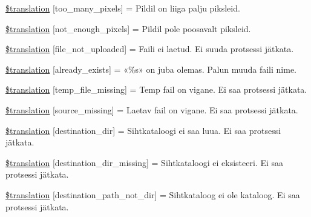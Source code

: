 \begin{DoxyCompactItemize}
\item 
\hyperlink{class_8upload_8et___e_e_8php_aa4051ef64e94a3f8295c63cf85544016}{\$translation} \mbox{[}\textquotesingle{}too\+\_\+many\+\_\+pixels\textquotesingle{}\mbox{]} = \textquotesingle{}Pildil on liiga palju piksleid.\textquotesingle{}
\item 
\hyperlink{class_8upload_8et___e_e_8php_a1fe342c27ce61f4ff4e0120ba647033e}{\$translation} \mbox{[}\textquotesingle{}not\+\_\+enough\+\_\+pixels\textquotesingle{}\mbox{]} = \textquotesingle{}Pildil pole poosavalt piksleid.\textquotesingle{}
\item 
\hyperlink{class_8upload_8et___e_e_8php_a4ce76e7be0b3a03c2b47f6d70c21832e}{\$translation} \mbox{[}\textquotesingle{}file\+\_\+not\+\_\+uploaded\textquotesingle{}\mbox{]} = \textquotesingle{}Faili ei laetud. Ei suuda protsessi jätkata.\textquotesingle{}
\item 
\hyperlink{class_8upload_8et___e_e_8php_afd84e910217f04139f567c41e292afa5}{\$translation} \mbox{[}\textquotesingle{}already\+\_\+exists\textquotesingle{}\mbox{]} = \textquotesingle{}«\%s» on juba olemas. Palun muuda faili nime.\textquotesingle{}
\item 
\hyperlink{class_8upload_8et___e_e_8php_ab0fa87a88aba2624004581eed0633325}{\$translation} \mbox{[}\textquotesingle{}temp\+\_\+file\+\_\+missing\textquotesingle{}\mbox{]} = \textquotesingle{}Temp fail on vigane. Ei saa protsessi jätkata.\textquotesingle{}
\item 
\hyperlink{class_8upload_8et___e_e_8php_aceaaf7355acaaf10f0ae60378d03c468}{\$translation} \mbox{[}\textquotesingle{}source\+\_\+missing\textquotesingle{}\mbox{]} = \textquotesingle{}Laetav fail on vigane. Ei saa protsessi jätkata.\textquotesingle{}
\item 
\hyperlink{class_8upload_8et___e_e_8php_aff2427c72a2598aefa6d58df1dd18b08}{\$translation} \mbox{[}\textquotesingle{}destination\+\_\+dir\textquotesingle{}\mbox{]} = \textquotesingle{}Sihtkataloogi ei saa luua. Ei saa protsessi jätkata.\textquotesingle{}
\item 
\hyperlink{class_8upload_8et___e_e_8php_a9ef28d3cf09942c6c0a1e77fa09185e8}{\$translation} \mbox{[}\textquotesingle{}destination\+\_\+dir\+\_\+missing\textquotesingle{}\mbox{]} = \textquotesingle{}Sihtkataloogi ei eksisteeri. Ei saa protsessi jätkata.\textquotesingle{}
\item 
\hyperlink{class_8upload_8et___e_e_8php_a5704a67137126e8c87b7a364175929d4}{\$translation} \mbox{[}\textquotesingle{}destination\+\_\+path\+\_\+not\+\_\+dir\textquotesingle{}\mbox{]} = \textquotesingle{}Sihtkataloog ei ole kataloog. Ei saa protsessi jätkata.\textquotesingle{}

\end{DoxyCompactItemize}
